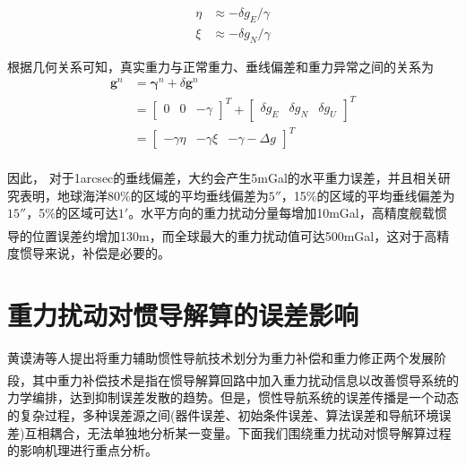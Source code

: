 \documentclass[12pt,a4,utf8]{article}
\newcommand{\upcite}[1]{\textsuperscript{\textsuperscript{\cite{#1}}}} %
\begin{document}
\begin{equation}
      \begin{aligned}
            \eta & \approx -\delta g_E / \gamma \\
            \xi  & \approx -\delta g_N / \gamma
      \end{aligned}
      \label{equ_1}
\end{equation}

根据几何关系可知，真实重力与正常重力、垂线偏差和重力异常之间的关系为
\begin{equation}
      \begin{aligned}
            \bm{g}^n & = \bm{\gamma}^n + \delta \bm{g}^n               \\
                     & =\begin{bmatrix}
                              0 & 0 & -\gamma
                        \end{bmatrix}^T +
            \begin{bmatrix}
                  \delta g_E & \delta g_N & \delta g_U
            \end{bmatrix}^T                       \\
                     & = \begin{bmatrix}
                               -\gamma\eta & -\gamma\xi & -\gamma - \Delta g
                         \end{bmatrix}^T
      \end{aligned}
      \label{equ_2}
\end{equation}

因此， 对于1arcsec的垂线偏差，大约会产生5mGal的水平重力误差\upcite{jekeli1994airborne}，并且相关研究表明，地球海洋80\%的区域的平均垂线偏差为$5''$，15\%的区域的平均垂线偏差为$15''$，5\%的区域可达$1'$。水平方向的重力扰动分量每增加10mGal，高精度舰载惯导的位置误差约增加130m\cite{Luxin2010}，而全球最大的重力扰动值可达500mGal\upcite{peshekhonov2020problem}，这对于高精度惯导来说，补偿是必要的。

\section{重力扰动对惯导解算的误差影响}
黄谟涛等人提出将重力辅助惯性导航技术划分为重力补偿和重力修正两个发展阶段\upcite{WHCH20240724001}，其中重力补偿技术是指在惯导解算回路中加入重力扰动信息以改善惯导系统的力学编排，达到抑制误差发散的趋势。但是，惯性导航系统的误差传播是一个动态的复杂过程，多种误差源之间(器件误差、初始条件误差、算法误差和导航环境误差)互相耦合，无法单独地分析某一变量。下面我们围绕重力扰动对惯导解算过程的影响机理进行重点分析。
\end{document}
